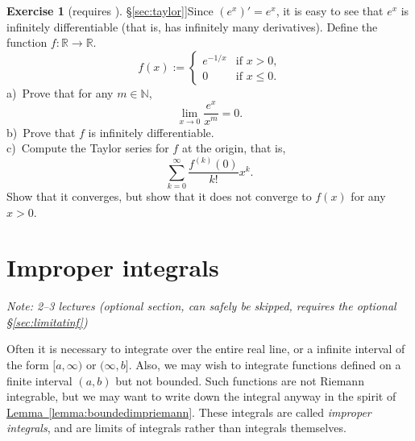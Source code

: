 \documentclass[12pt]{book}
\newcommand{\R}{{\mathbb{R}}}
\newcommand{\N}{{\mathbb{N}}}
\newcommand{\myindex}[1]{#1\index{#1}}
\newcommand{\sectionnotes}[1]{\noindent \emph{Note: #1} \medskip \par}
\newcommand{\sectionnewpage}{\clearpage}
\theoremstyle{plain}
\theoremstyle{remark}
\theoremstyle{definition}
\theoremstyle{exercise}
\newtheorem{exercise}{Exercise}[section]
\theoremstyle{example}
\newcommand{\sectionref}[1]{\hyperref[#1]{\S\ref*{#1}}}
\newcommand{\lemmaref}[1]{\hyperref[#1]{Lemma~\ref*{#1}}}
\begin{document}
\begin{exercise}[requires \sectionref{sec:taylor}]\label{exercise:nonanalytic}
Since $(e^x)' = e^x$, it is easy to see that $e^x$ is infinitely
differentiable (that is, has infinitely many derivatives).  Define the function $f \colon \R \to \R$.
\begin{equation*}
f(x) := \begin{cases}
e^{-1/x} & \text{if $x > 0$,} \\
0 & \text{if $x \leq 0$}.
\end{cases}
\end{equation*}
a)~Prove that for any $m \in \N$,
\begin{equation*}
\lim_{x \to 0} \frac{e^x}{x^m} = 0 .
\end{equation*}
b)~Prove that $f$ is infinitely differentiable.\\
c)~Compute the Taylor series for $f$ at the origin, that is,
\begin{equation*}
\sum_{k=0}^\infty
\frac{f^{(k)}(0)}{k!}x^k .
\end{equation*}
Show that it converges, but show that it does not converge to $f(x)$
for any $x > 0$.
\end{exercise}


\sectionnewpage
\section{Improper integrals}
\label{sec:impropriemann}

\sectionnotes{2--3 lectures (optional section, can safely be skipped, 
requires the optional \sectionref{sec:limitatinf})}

Often it is necessary to integrate over the
entire real line, or a infinite interval of the form $[a,\infty)$ or
$(\infty,b]$.  Also, we may wish to integrate functions defined on a finite
interval $(a,b)$ but not bounded.
Such functions are not Riemann integrable, but we may want to write down
the integral anyway in the spirit of \lemmaref{lemma:boundedimpriemann}.
These integrals are called \emph{\myindex{improper integrals}},
and are limits
of integrals rather than integrals themselves.
\end{document}
